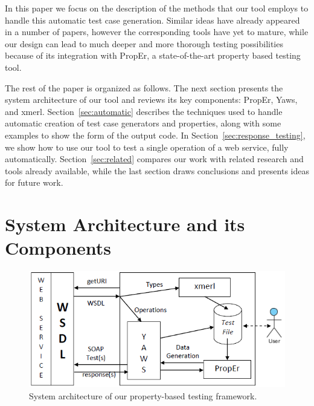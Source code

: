 \documentclass[copyright]{eptcs}
\begin{document}

In this paper we focus on the description of the methods that our tool
employs to handle this automatic test case generation. Similar ideas
have already appeared in a number of papers, however the corresponding
tools have yet to mature, while our design can lead to much deeper and
more thorough testing possibilities because of its integration with
PropEr, a state-of-the-art property based testing tool.


The rest of the paper is organized as follows.
The next section presents the system architecture of our tool and
reviews its key components: PropEr, Yaws, and xmerl.
Section~\ref{sec:automatic} describes the techniques used to handle
automatic creation of test case generators and properties, along with
some examples to show the form of the output code.
In Section~\ref{sec:response_testing}, we show how to use our tool to
test a single operation of a web service, fully automatically.
Section~\ref{sec:related} compares our work with related research and
tools already available, while the last section draws conclusions and
presents ideas for future work.


\section{System Architecture and its Components} \label{sec:architecture}

\begin{figure}[!b]
\centering
\includegraphics[height=.245\textheight]{Framework.png}
\caption{System architecture of our property-based testing framework.}
\label{fig:architecture}
\end{figure}
\end{document}
